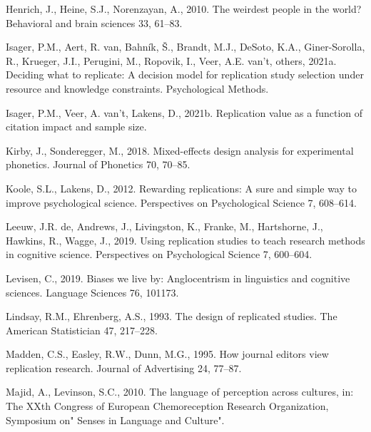 \documentclass[]{elsarticle} %
\newlength{\cslhangindent}
\newlength{\cslentryspacingunit} %
\newenvironment{CSLReferences}[2] %
 {%
  \setlength{\parindent}{0pt}
  \ifodd #1
  \let\oldpar\par
  \def\par{\hangindent=\cslhangindent\oldpar}
  \fi
  \setlength{\parskip}{#2\cslentryspacingunit}
 }%
 {}
\begin{document}
\begin{CSLReferences}{1}{0}
\leavevmode{}%
Henrich, J., Heine, S.J., Norenzayan, A., 2010. The weirdest people in the world? Behavioral and brain sciences 33, 61--83.

\leavevmode{}%
Isager, P.M., Aert, R. van, Bahník, Š., Brandt, M.J., DeSoto, K.A., Giner-Sorolla, R., Krueger, J.I., Perugini, M., Ropovik, I., Veer, A.E. van't, others, 2021a. Deciding what to replicate: A decision model for replication study selection under resource and knowledge constraints. Psychological Methods.

\leavevmode{}%
Isager, P.M., Veer, A. van't, Lakens, D., 2021b. Replication value as a function of citation impact and sample size.

\leavevmode{}%
Kirby, J., Sonderegger, M., 2018. Mixed-effects design analysis for experimental phonetics. Journal of Phonetics 70, 70--85.

\leavevmode{}%
Koole, S.L., Lakens, D., 2012. Rewarding replications: {A} sure and simple way to improve psychological science. Perspectives on Psychological Science 7, 608--614.

\leavevmode{}%
Leeuw, J.R. de, Andrews, J., Livingston, K., Franke, M., Hartshorne, J., Hawkins, R., Wagge, J., 2019. Using replication studies to teach research methods in cognitive science. Perspectives on Psychological Science 7, 600--604.

\leavevmode{}%
Levisen, C., 2019. Biases we live by: Anglocentrism in linguistics and cognitive sciences. Language Sciences 76, 101173.

\leavevmode{}%
Lindsay, R.M., Ehrenberg, A.S., 1993. The design of replicated studies. The American Statistician 47, 217--228.

\leavevmode{}%
Madden, C.S., Easley, R.W., Dunn, M.G., 1995. How journal editors view replication research. Journal of Advertising 24, 77--87.

\leavevmode{}%
Majid, A., Levinson, S.C., 2010. The language of perception across cultures, in: The XXth Congress of European Chemoreception Research Organization, Symposium on" Senses in Language and Culture".


\end{CSLReferences}
\end{document}
